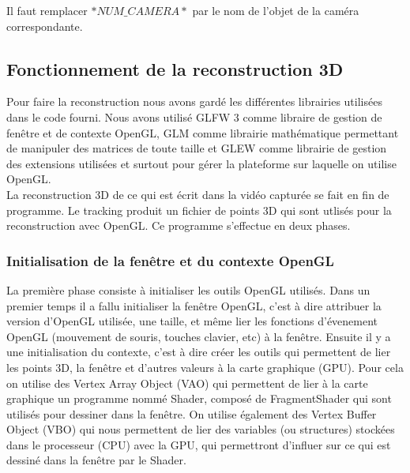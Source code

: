 Il faut remplacer $*NUM\_CAMERA*$ par le nom de l'objet de la caméra correspondante.

\subsection{Fonctionnement de la reconstruction 3D}

Pour faire la reconstruction nous avons gardé les différentes librairies utilisées dans le code fourni. Nous avons utilisé GLFW 3 comme libraire de gestion de fenêtre et de contexte OpenGL, GLM comme librairie mathématique permettant de manipuler des matrices de toute taille et GLEW comme librairie de gestion des extensions utilisées et surtout pour gérer la plateforme sur laquelle on utilise OpenGL. \\
 
La reconstruction 3D de ce qui est écrit dans la vidéo capturée se fait en fin de programme. Le tracking produit un fichier de points 3D qui sont utlisés pour la reconstruction avec OpenGL. Ce programme s'effectue en deux phases. \\

\subsubsection{Initialisation de la fenêtre et du contexte OpenGL}
La première phase consiste à initialiser les outils OpenGL utilisés. Dans un premier temps il a fallu initialiser la fenêtre OpenGL, c'est à dire attribuer la version d'OpenGL utilisée, une taille, et même lier les fonctions d'évenement OpenGL (mouvement de souris, touches clavier, etc) à la fenêtre. Ensuite il y a une initialisation du contexte, c'est à dire créer les outils qui permettent de lier les points 3D, la fenêtre et d'autres valeurs à la carte graphique (GPU). Pour cela on utilise des Vertex Array Object (VAO) qui permettent de lier à la carte graphique un programme nommé Shader, composé de FragmentShader qui sont utilisés pour dessiner dans la fenêtre. On utilise également des Vertex Buffer Object (VBO) qui nous permettent de lier des variables (ou structures) stockées dans le processeur (CPU) avec la GPU, qui permettront d'influer sur ce qui est dessiné dans la fenêtre par le Shader. \\


